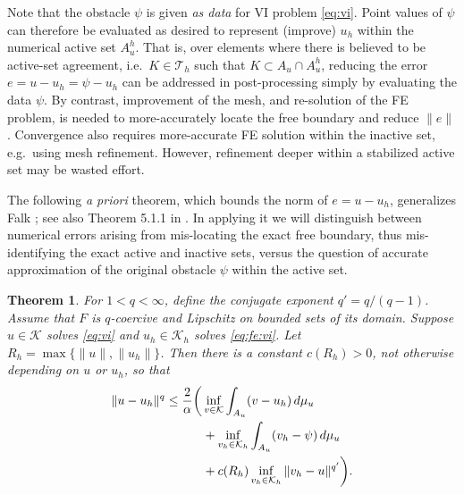 \documentclass[]{interact}
\theoremstyle{plain}%
\newtheorem{theorem}{Theorem}[section]
\theoremstyle{definition}
\theoremstyle{remark}
\newcommand{\cK}{\mathcal{K}}
\newcommand{\cT}{\mathcal{T}}
\begin{document}
Note that the obstacle $\psi$ is given \emph{as data} for VI problem \eqref{eq:vi}.  Point values of $\psi$ can therefore be evaluated as desired to represent (improve) $u_h$ within the numerical active set $A_u^h$.  That is, over elements where there is believed to be active-set agreement, i.e.~$K\in\cT_h$ such that $K \subset A_u \cap A_u^h$, reducing the error $e=u-u_h=\psi-u_h$ can be addressed in post-processing simply by evaluating the data $\psi$.  By contrast, improvement of the mesh, and re-solution of the FE problem, is needed to more-accurately locate the free boundary and reduce $\|e\|$.  Convergence also requires more-accurate FE solution within the inactive set, e.g.~using mesh refinement.  However, refinement deeper within a stabilized active set may be wasted effort.

The following \emph{a priori} theorem, which bounds the norm of $e=u-u_h$, generalizes Falk \cite{Falk1974}; see also Theorem 5.1.1 in \cite{Ciarlet2002}.  In applying it we will distinguish between numerical errors arising from mis-locating the exact free boundary, thus mis-identifying the exact active and inactive sets, versus the question of accurate approximation of the original obstacle $\psi$ within the active set.

\begin{theorem} \label{thm:genfalk}  For $1<q<\infty$, define the conjugate exponent $q'=q/(q-1)$.  Assume that $F$ is $q$-coercive and Lipschitz on bounded sets of its domain.  Suppose $u\in\cK$ solves \eqref{eq:vi} and $u_h\in\cK_h$ solves \eqref{eq:fe:vi}.  Let $R_h=\max\{\|u\|,\|u_h\|\}$.  Then there is a constant $c(R_h)>0$, not otherwise depending on $u$ or $u_h$, so that
\begin{align}
\|u-u_h\|^q &\le \frac{2}{\alpha} \bigg( \inf_{v\in\cK} \int_{A_u} (v-u_h)\,d\mu_u \label{eq:falk} \\
   &\qquad\quad + \inf_{v_h\in\cK_h} \int_{A_u} (v_h-\psi)\,d\mu_u \notag \\
   &\qquad\quad + c(R_h) \inf_{v_h\in\cK_h} \|v_h - u\|^{q'}\bigg). \notag
\end{align}
\end{theorem}
\end{document}

